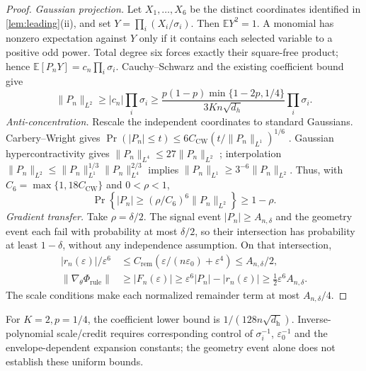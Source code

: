\begin{proof}
\emph{Gaussian projection.} Let $X_1,\ldots,X_6$ be the distinct coordinates
identified in \cref{lem:leading}(ii), and set $Y=\prod_i(X_i/\sigma_i)$.
Then $\mathbb E Y^2=1$. A monomial has nonzero expectation against $Y$
only if it contains each selected variable to a positive odd power.
Total degree six forces exactly their square-free product; hence
$\mathbb E[P_nY]=c_n\prod_i\sigma_i$. Cauchy--Schwarz and the existing coefficient bound give
\begin{equation}\label{eq:quant-rule-L2}
 \|P_n\|_{L^2}\ge |c_n|\prod_i\sigma_i
 \ge\frac{p(1-p)\min\{1-2p,1/4\}}{3Kn\sqrt{d_h}}\prod_i\sigma_i.
\end{equation}
\emph{Anti-concentration.} Rescale the independent coordinates to standard
Gaussians. Carbery--Wright gives
$\Pr(|P_n|\le t)\le6C_{\mathrm{CW}}(t/\|P_n\|_{L^1})^{1/6}$
\citep{carbery2001distributional}. Gaussian hypercontractivity gives
$\|P_n\|_{L^4}\le27\|P_n\|_{L^2}$ \citep{janson1997gaussian}; interpolation
$\|P_n\|_{L^2}\le\|P_n\|_{L^1}^{1/3}\|P_n\|_{L^4}^{2/3}$ implies
$\|P_n\|_{L^1}\ge3^{-6}\|P_n\|_{L^2}$.
Thus, with $C_6=\max\{1,18C_{\mathrm{CW}}\}$ and $0<\rho<1$,
\begin{equation}\label{eq:quant-rule-AC}
 \Pr\!\left\{|P_n|\ge(\rho/C_6)^6\|P_n\|_{L^2}\right\}\ge1-\rho.
\end{equation}
\emph{Gradient transfer.} Take $\rho=\delta/2$. The signal event
$|P_n|\ge A_{n,\delta}$ and the geometry event each fail with probability
at most $\delta/2$, so their intersection has probability at least
$1-\delta$, without any independence assumption. On that intersection,
\begin{align*}
 |r_n(\varepsilon)|/\varepsilon^6
 &\le C_{\mathrm{rem}}(\varepsilon/(n\varepsilon_0)+\varepsilon^4)
 \le A_{n,\delta}/2,\\
 \|\nabla_\theta\Phi_{\mathrm{rule}}\|
 &\ge |F_n(\varepsilon)|\ge\varepsilon^6|P_n|-|r_n(\varepsilon)|
 \ge\tfrac12\varepsilon^6 A_{n,\delta}.
\end{align*}
The scale conditions make each normalized remainder term at most
$A_{n,\delta}/4$.
\end{proof}



For $K=2,p=1/4$, the coefficient lower bound is $1/(128n\sqrt{d_{\mathrm h}})$. Inverse-polynomial scale/credit
requires corresponding control of $\sigma_i^{-1}$, $\varepsilon_0^{-1}$
and the envelope-dependent expansion constants; the geometry event alone
does not establish these uniform bounds.

